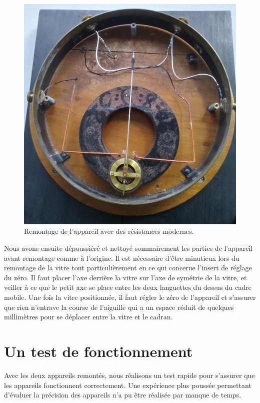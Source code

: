 \documentclass[12pt,a4paper,fleqn]{article}
\begin{document}
\begin{figure}[htbp]
    \center
    \includegraphics[height=300 pt]{images/20210505_155742_HDR.jpg}
    \caption{Remontage de l'appareil avec des résistances modernes.
    \label{fig:galva_volt_mod}
}
\end{figure}

Nous avons ensuite dépoussiéré et nettoyé sommairement les parties de l'appareil avant remontage comme à l'origine.
Il est nécessaire d'être minutieux lors du remontage de la vitre tout particulièrement en ce qui concerne l'insert de réglage du zéro.
Il faut placer l'axe derrière la vitre sur l'axe de symétrie de la vitre, et veiller à ce que le petit axe se place entre les deux languettes du dessus du cadre mobile.
Une fois la vitre positionnée, il faut régler le zéro de l'appareil et s'assurer que rien n'entrave la course de l'aiguille qui a un espace réduit de quelques millimètres pour se déplacer entre la vitre et le cadran.









\section{Un test de fonctionnement}

Avec les deux appareils remontés, nous réalisons un test rapide pour s'assurer que les appareils fonctionnent correctement.
Une expérience plus poussée permettant d'évaluer la précision des appareils n'a pu être réalisée par manque de temps.
\end{document}

